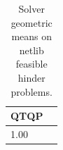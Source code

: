 \begin{table}
\caption{Solver geometric means on netlib feasible hinder problems.}
\label{t-netlib feasible hinder-geom_mean}
\begin{tabular}{lc}
\toprule
QTQP \\
\midrule
1.00 \\
\bottomrule
\end{tabular}
\end{table}
